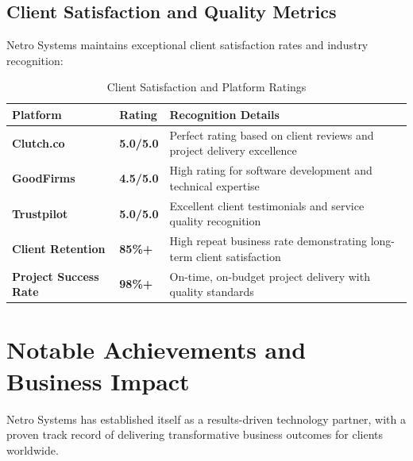 \documentclass[12pt,a4paper]{report}
\newcommand{\tableheaderrow}{\rowcolor{tableheader}}
\newcommand{\tablealtrow}{\rowcolor{tablealt1}}
\newcommand{\impact}[1]{\textcolor{impactcolor}{\textbf{#1}}}
\begin{document}
\subsection{Client Satisfaction and Quality Metrics}
Netro Systems maintains exceptional client satisfaction rates and industry recognition:

\begin{table}[h!]
\centering
\caption{Client Satisfaction and Platform Ratings}
\label{tab:client_satisfaction}
\begin{tabular}{p{3.5cm} p{2.5cm} p{7cm}}
\toprule
\tableheaderrow \textcolor{headertext}{\textbf{Platform}} & \textcolor{headertext}{\textbf{Rating}} & \textcolor{headertext}{\textbf{Recognition Details}} \\
\midrule
\tablealtrow \impact{Clutch.co} & \textbf{5.0/5.0} & Perfect rating based on client reviews and project delivery excellence \\
\impact{GoodFirms} & \textbf{4.5/5.0} & High rating for software development and technical expertise \\
\tablealtrow \impact{Trustpilot} & \textbf{5.0/5.0} & Excellent client testimonials and service quality recognition \\
\impact{Client Retention} & \textbf{85\%+} & High repeat business rate demonstrating long-term client satisfaction \\
\tablealtrow \impact{Project Success Rate} & \textbf{98\%+} & On-time, on-budget project delivery with quality standards \\
\bottomrule
\end{tabular}
\end{table}

\section{Notable Achievements and Business Impact}
Netro Systems has established itself as a results-driven technology partner, with a proven track record of delivering transformative business outcomes for clients worldwide.
\end{document}
